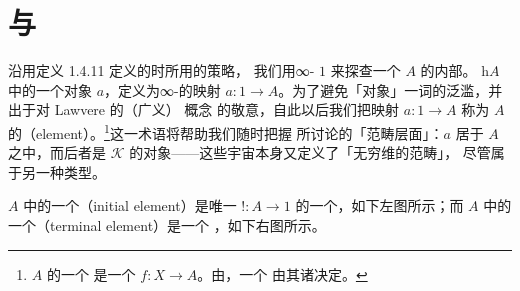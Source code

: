 \providecommand{\Fun}{\operatorname{Fun}}
\providecommand{\Cat}{\mathcal{C}at}
\providecommand{\QCat}{\mathcal{Q}\mathcal{C}at}
\providecommand{\qcOne}{\mathbf{1}}   %

\section{\trInitial{}\trElement{}与\trTerminal{}\trElement}\label{sec:initial-and-terminal-elements}

沿用定义 1.4.11 定义\trInfinityCategory{}的\trHomotopyCategory{}时所用的策略，
我们用\trTerminal{}∞-\trCategory{} $1$ 来探查一个\trInfinityCategory{} $A$ 的内部。%
\trHomotopyCategory{} $\mathrm{h}A$ 中的一个对象 $a$，定义为∞-\trCategory{}的映射
$a\colon 1\to A$。为了避免「对象」一词的泛滥，并出于对 Lawvere 的（广义）
\trElement{}概念 \cite{bib74} 的敬意，自此以后我们把映射 $a\colon 1\to A$ 称为%
\trInfinityCategory{} $A$ 的\textbf{\trElement}（element）。\footnote{$A$ 的一个%
\trGeneralizedElement{}是一个\trFunctor{} $f\colon X\to A$。由\trYonedaLemma{}，一个%
\trInfinityCategory{}由其诸\trGeneralizedElement{}决定。}这一术语将帮助我们随时把握
所讨论的「范畴层面」：\trElement $a$ 居于\trInfinityCategory{} $A$ 之中，而后者是%
\trInfinityCosmos{} $\mathcal{K}$ 的对象——这些宇宙本身又定义了「无穷维的范畴」，
尽管属于另一种类型。

\begin{definition}\label{def:initial-terminal-element}
\trInfinityCategory{} $A$ 中的一个\textbf{\trInitial{}\trElement}（initial element）是唯一%
\trFunctor{} $!\colon A\to 1$ 的一个\trLeftAdjoint{}，如下左图所示；而%
\trInfinityCategory{} $A$ 中的一个\textbf{\trTerminal{}\trElement}（terminal element）是一个%
\trRightAdjoint{}，如下右图所示。
\begin{center}
\end{center}
\end{definition}

